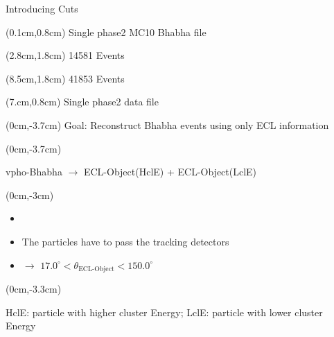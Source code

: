 \documentclass[8pt]{beamer}
\begin{document}
\begin{frame}{Introducing Cuts}
\begin{textblock*}{11cm}
\begin{figure}[h!]
\end{figure}

\end{textblock*}
\pause[4]

\begin{textblock*}{5cm}(0.1cm,0.8cm)
	\centering
	Single phase2 MC10 Bhabha file
\end{textblock*}


\begin{textblock*}{4cm}(2.8cm,1.8cm)
	14581 Events
\end{textblock*}
\pause[5]

\begin{textblock*}{4cm}(8.5cm,1.8cm)
	41853 Events
\end{textblock*}


\begin{textblock*}{4cm}(7.cm,0.8cm)
	Single phase2 data file
\end{textblock*}


\pause[6]



\pause[1]




		


	
\begin{textblock*}{11cm}(0cm,-3.7cm)
				Goal: Reconstruct Bhabha events using only ECL information

	\end{textblock*}
\begin{textblock*}{11cm}(0cm,-3.7cm)	
	\begin{center}
		
		vpho-Bhabha $\rightarrow$ ECL-Object(HclE) + ECL-Object(LclE)		
	\end{center}
\end{textblock*}
\pause[2]
	\begin{textblock*}{11cm}(0cm,-3cm)
	
	\begin{itemize}
		\item[]
		\item The particles have to pass the tracking detectors
		\item[] $\rightarrow$ $17.0^{\circ} < \theta_{\textrm{ECL-Object}} < 150.0^{\circ}$

	\end{itemize}	
\end{textblock*}


\pause[1]
\begin{textblock*}{11cm}(0cm,-3.3cm)
	\begin{center}
		\footnotesize{HclE: particle with higher cluster Energy; LclE: particle with lower cluster Energy}
	\end{center}
\end{textblock*}


\end{frame}
\end{document}
